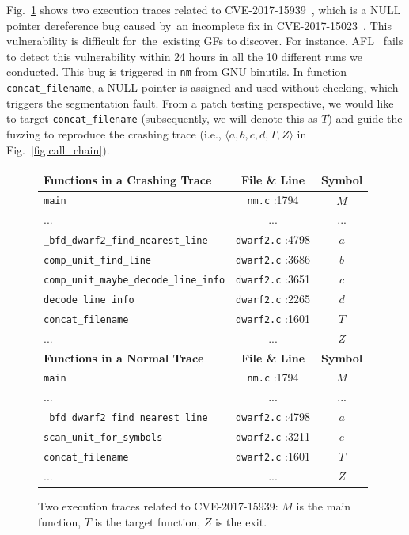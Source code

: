 Fig.~\ref{fig:exam_trace} shows two execution traces related to CVE-2017-15939~\cite{cve-2017-15939}, which is a NULL pointer dereference bug caused by~an incomplete fix in CVE-2017-15023~\cite{cve-2017-15023}.
This vulnerability is difficult for~the~existing GFs to discover.
For instance, AFL~\cite{afl} fails to detect this vulnerability within 24 hours in all the 10 different runs we conducted.
This bug is triggered in \texttt{nm} from GNU binutils.
In function \texttt{concat\_filename}, a NULL pointer is assigned and used without checking, which triggers the segmentation fault.
From a patch testing perspective, we would like to target \texttt{concat\_filename} (subsequently, we will denote this as $T$) and guide the fuzzing to reproduce the crashing trace (i.e., $\langle a, b, c, d, T, Z\rangle$ in Fig.~\ref{fig:call_chain}).




\begin{figure}[t]
	\centering
	\small \begin{tabular}{lcc}
		\hline
  \textbf{Functions in a Crashing Trace} &  	\textbf{File \& Line} & \textbf{Symbol} \\\hline
  	 \texttt{main}   &   \texttt{nm.c} :1794     & \textsf{$M$}\\
 	   ... &  ...  &...  \\
 	 \texttt{\_bfd\_dwarf2\_find\_nearest\_line}     &   \texttt{dwarf2.c} :4798   &  \textsf{$a$}\\
 	 \texttt{comp\_unit\_find\_line}    &   \texttt{dwarf2.c} :3686    & \textsf{$b$}\\
 	 \texttt{comp\_unit\_maybe\_decode\_line\_info} &	 \texttt{dwarf2.c} :3651       &  \textsf{$c$}\\
  	 \texttt{decode\_line\_info}   &    \texttt{dwarf2.c} :2265     &  \textsf{$d$} \\
\texttt{concat\_filename}   &   \texttt{dwarf2.c} :1601     &  \textsf{$T$}\\
    ... 	 	  &     ... 	  &  \textsf{$Z$}\\\hline
	  \textbf{Functions in a Normal Trace} &  	\textbf{File \& Line} & \textbf{Symbol} \\\hline
	   \texttt{main}   &   \texttt{nm.c} :1794     &  \textsf{$M$}\\
	      ... &  ...  &...  \\
	   \texttt{\_bfd\_dwarf2\_find\_nearest\_line}     & \texttt{dwarf2.c} :4798      & \textsf{$a$}\\
	  \texttt{scan\_unit\_for\_symbols}    &      \texttt{dwarf2.c} :3211        &  \textsf{$e$}\\
  \texttt{concat\_filename}   &  \texttt{dwarf2.c} :1601      &  \textsf{$T$}\\
	    ... 	 	  &     ...       & \textsf{$Z$}\\\hline
	\end{tabular}
\vspace{-5pt}
	\caption{Two execution traces related to CVE-2017-15939: $M$ is the main function, $T$ is the target function, $Z$ is the exit.}
	\label{fig:exam_trace}
\end{figure}



